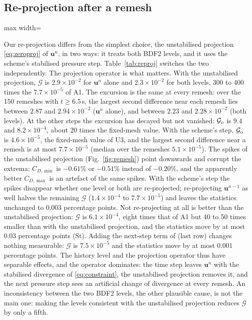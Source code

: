 \documentclass[preprint,12pt,number]{elsarticle}
\newcommand{\fittable}[1]{{\small\setlength{\tabcolsep}{4pt}\begin{adjustbox}{max width=\textwidth}\end{adjustbox}}}
\newcommand{\bu}{\mathbf{u}}
\newcommand{\dt}{\Delta t}
\begin{document}
\subsection{Re-projection after a remesh}

\begin{table}[!htbp]
\centering
\caption{Ablations on A1 (DFG 2D-2, $\dt = 1\,$ms): errors [\%] against FEATFLOW level 6,
force-oscillation indicator $\mathcal{G}$ and wall-pressure oscillation.}
\label{tab:ablation}
\fittable{tables/tab_ablation.tex}
\end{table}

Our re-projection differs from the simplest choice, the unstabilised projection
\eqref{eq:zeroproj} of $\bu^n$, in two ways: it treats both BDF2 levels, and it uses the
scheme's stabilised pressure step. Table~\ref{tab:reproj} switches the two independently. The
projection operator is what matters. With the unstabilised projection, $\mathcal{G}$ is
$2.9\times10^{-2}$ for $\bu^n$ alone and $2.3\times10^{-2}$ for both levels, 300 to 400 times
the $7.7\times10^{-5}$ of A1. The excursion is the same at every remesh: over the 150 remeshes
with $t \ge 6.5\,$s, the largest second difference near each remesh lies between $2.87$ and
$2.94\times10^{-2}$ ($\bu^n$ alone), and between $2.23$ and $2.28\times10^{-2}$ (both levels).
At the other steps the excursion has decayed but not vanished: $\mathcal{G}_{\rm o}$ is $9.4$ and
$8.2\times10^{-4}$, about 20 times the fixed-mesh value. With the scheme's
step, $\mathcal{G}_{\rm o}$ is $4.6\times10^{-5}$, the fixed-mesh value of U3, and the largest
second difference near a remesh is at most $7.7\times10^{-5}$ (median over the remeshes
$5.1\times10^{-5}$). The spikes of the unstabilised projection (Fig.~\ref{fig:remesh}) point
downwards and corrupt the extrema: $C_{D,\min}$ is
$-0.61\%$ or $-0.51\%$ instead of $-0.20\%$, and the apparently better $C_{D,\max}$ is an
artefact of the same spikes. With the scheme's step the spikes disappear whether one level or
both are re-projected; re-projecting $\bu^{n-1}$ as well halves the remaining $\mathcal{G}$
($1.4\times10^{-4}$ to $7.7\times10^{-5}$) and leaves the statistics unchanged to 0.003
percentage points. Not re-projecting at all is better than the unstabilised projection:
$\mathcal{G}$ is $6.1\times10^{-4}$, eight times that of A1 but 40 to 50 times smaller than with the
unstabilised projection, and the statistics move by at most 0.03 percentage points (St).
Adding the next-step term of \citet{braack2013} (last row) changes nothing measurable:
$\mathcal{G}$ is $7.5\times10^{-5}$ and the statistics move by at most 0.001 percentage points. The
history level and the projection operator thus have separable effects, and the operator
dominates: the time step leaves $\bu^n$ with the stabilised divergence of
\eqref{eq:constraint}, the unstabilised projection removes it, and the next pressure
step sees an artificial change of divergence at every remesh. An inconsistency between the two
BDF2 levels, the other plausible cause, is not the main one: making the levels consistent with the
unstabilised projection reduces $\mathcal{G}$ by only a fifth.
\end{document}
